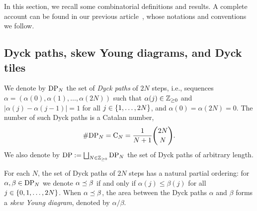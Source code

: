 \documentclass[oneside,english]{amsart}
\numberwithin{equation}{section}
\numberwithin{figure}{section}
\theoremstyle{plain}
\theoremstyle{plain}
\theoremstyle{plain}
\theoremstyle{remark}
\theoremstyle{plain}
\theoremstyle{plain}
\theoremstyle{plain}
\theoremstyle{plain}
\theoremstyle{plain}
\theoremstyle{plain}
\theoremstyle{plain}
\theoremstyle{plain}
\newcommand{\alexmod}[1]{{\color{allucol} #1}}
\newcommand{\blue}[1]{{\color{blue} #1}}
\begin{document}
In this section, we recall some combinatorial definitions and  results. A complete account can be found in 
our previous article~\cite[Section~2]{KKP-boundary_correlations_in_planar_LERW_and_UST}, whose notations and conventions we follow.

\subsection{Dyck paths, skew Young diagrams, and Dyck tiles}

We denote by $\mathrm{DP}_N$ the set of \emph{Dyck paths} of $2N$ steps, i.e., %
sequences $\alpha = (\alpha(0), \alpha(1), \ldots, \alpha(2N))$ such that $\alpha(j) \in \mathbb{Z}_{\geq 0}$ and $|\alpha(j) - \alpha(j-1)| = 1$
for all %
$j \in \left\{ 1,\ldots,2N\right\}$, 
and $\alpha(0) = \alpha(2N)=0$. The number of such Dyck paths is a Catalan number,
\begin{align*}
\# \mathrm{DP}_N = \mathrm{C}_N = \frac{1}{N+1} \binom{2N}{N} .
\end{align*}
We also denote by $\mathrm{DP} := \bigsqcup_{N \in \mathbb{Z}_{\geq 0}} \mathrm{DP}_N$ the set of
Dyck paths of arbitrary length.

For each $N$, the set of Dyck paths of $2N$ steps has a natural partial ordering:
for $\alpha, \beta \in \mathrm{DP}_N$ we denote $\alpha \preceq \beta$
if and only if $\alpha(j) \leq \beta(j)$ for all %
$j \in \left\{ 0,1,\ldots,2N\right\}$.
When $\alpha \preceq \beta$, the area between the Dyck paths $\alpha$ and $\beta$
forms a \emph{skew Young diagram}, denoted by $\alpha / \beta$.
\end{document}
